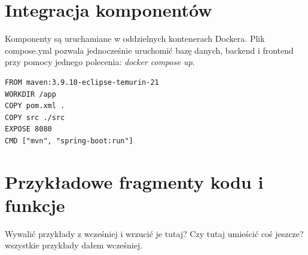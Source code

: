 \section{Integracja komponentów}
Komponenty są uruchamiane w oddzielnych kontenerach Dockera. Plik compose.yml pozwala jednocześnie uruchomić bazę danych, backend i frontend przy pomocy jednego polecenia: \textit{docker compose up}.
\begin{lstlisting}[caption={Budowanie obrazu - Dockerfile}, label={lst:Docker-build}]
FROM maven:3.9.10-eclipse-temurin-21
WORKDIR /app
COPY pom.xml .
COPY src ./src
EXPOSE 8080
CMD ["mvn", "spring-boot:run"]
\end{lstlisting}
\section{Przykładowe fragmenty kodu i funkcje}
Wywalić przykłady z wcześniej i wrzucić je tutaj? Czy tutaj umieścić coś jeszcze? wszystkie przykłady dałem wcześniej.